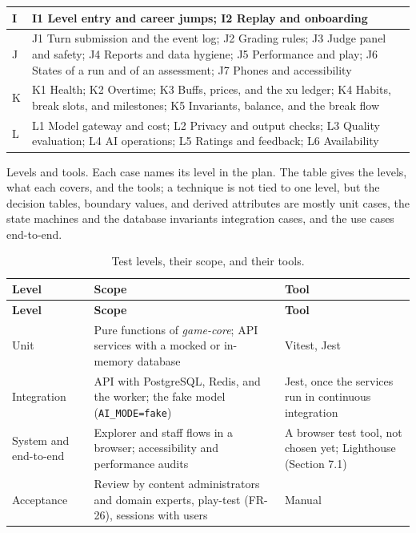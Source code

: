 {\begin{longtable}{|>{\raggedright\arraybackslash}p{}|>{\raggedright\arraybackslash}p{}|}
I & I1 Level entry and career jumps; I2 Replay and onboarding \\ \hline
J & J1 Turn submission and the event log; J2 Grading rules; J3 Judge panel and safety; J4 Reports and data hygiene; J5 Performance and play; J6 States of a run and of an assessment; J7 Phones and accessibility \\ \hline
K & K1 Health; K2 Overtime; K3 Buffs, prices, and the xu ledger; K4 Habits, break slots, and milestones; K5 Invariants, balance, and the break flow \\ \hline
L & L1 Model gateway and cost; L2 Privacy and output checks; L3 Quality evaluation; L4 AI operations; L5 Ratings and feedback; L6 Availability \\ \hline
\end{longtable}
}

Levels and tools. Each case names its level in the plan. The table gives the levels, what each covers, and the tools; a technique is not tied to one level, but the decision tables, boundary values, and derived attributes are mostly unit cases, the state machines and the database invariants integration cases, and the use cases end-to-end.

{\small{}\renewcommand{\arraystretch}{1.1}
\begin{longtable}{|>{\raggedright\arraybackslash}p{}|>{\raggedright\arraybackslash}p{}|>{\raggedright\arraybackslash}p{}|}
\caption{Test levels, their scope, and their tools.} \\
\hline
\textbf{Level} & \textbf{Scope} & \textbf{Tool} \\ \hline
\endfirsthead
\hline
\textbf{Level} & \textbf{Scope} & \textbf{Tool} \\ \hline
\endhead
Unit & Pure functions of \textit{game-\allowbreak{}core}; API services with a mocked or in-memory database & Vitest, Jest \\ \hline
Integration & API with PostgreSQL, Redis, and the worker; the fake model (\texttt{AI\_\allowbreak{}MODE=fake}) & Jest, once the services run in continuous integration \\ \hline
System and end-to-end & Explorer and staff flows in a browser; accessibility and performance audits & A browser test tool, not chosen yet; Lighthouse (Section 7.1) \\ \hline
Acceptance & Review by content administrators and domain experts, play-test (FR-26), sessions with users & Manual \\ \hline
\end{longtable}
}

